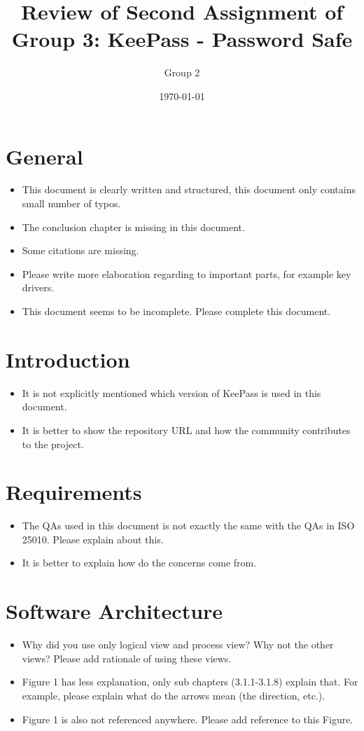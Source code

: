\documentclass[a4paper,10pt]{article}
\author{Group 2}
\date{\monthyeardate\today}
\title{Review of Second Assignment of Group 3: KeePass - Password Safe}
\begin{document}
\maketitle

\section{General}
\begin{itemize}
	\item This document is clearly written and structured, this document only contains small number of typos.
	\item The conclusion chapter is missing in this document.
	\item Some citations are missing.
	\item Please write more elaboration regarding to important parts, for example key drivers.
	\item This document seems to be incomplete. Please complete this document.
\end{itemize}

\section{Introduction}
\begin{itemize}
	\item It is not explicitly mentioned which version of KeePass is used in this document.
	\item It is better to show the repository URL and how the community contributes to the project.
\end{itemize}

\section{Requirements}
\begin{itemize}
	\item The QAs used in this document is not exactly the same with the QAs in ISO 25010. Please explain about this.
	\item It is better to explain how do the concerns come from.

\end{itemize}

\section{Software Architecture}
\begin{itemize}
	\item Why did you use only logical view and process view? Why not the other views? Please add rationale of using these views.
	\item Figure 1 has less explanation, only sub chapters (3.1.1-3.1.8) explain that. For example, please explain what do the arrows mean (the direction, etc.). 
	\item Figure 1 is also not referenced anywhere. Please add reference to this Figure.

\end{itemize}
\end{document}
